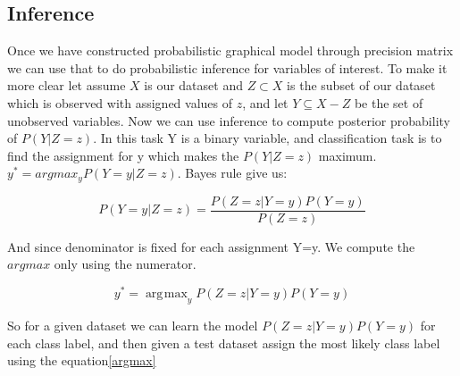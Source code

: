 \documentclass{article} %
\DeclareMathOperator*{\argmax}{\arg\!\max}
\begin{document}
\subsection{Inference}
Once we have constructed probabilistic graphical model through precision 
matrix we can use that to do probabilistic inference for variables of 
interest. To make it more clear let assume $X$ is our dataset and 
$Z \subset X$ is the subset of our dataset which is observed with 
assigned values of $z$, and let $Y \subseteq X - Z$ be the set of unobserved 
variables. Now we can use inference to compute posterior probability of 
$P(Y|Z=z)$. In this task Y is a binary variable, and classification task is 
to find the assignment for y which makes the $P(Y|Z=z)$ maximum. 
$y^* = argmax_{y} P(Y=y|Z=z)$. Bayes rule give us: 

\begin{equation}
P(Y=y|Z=z) = \frac{P(Z=z|Y=y)P(Y=y)}{P(Z=z)}
\end{equation}  

And since denominator is fixed for each assignment Y=y. We compute the $argmax$ only using the numerator. 

\begin{equation}\label{argmax}
y^* = \argmax_{y} P(Z=z|Y=y)P(Y=y) 
\end{equation} 

So for a given dataset we can learn the model $ P(Z=z|Y=y)P(Y=y)$ for each 
class label, and then given a test dataset assign the most likely class 
label using the equation\eqref{argmax} \cite{Rish2014Book}  
\end{document}
